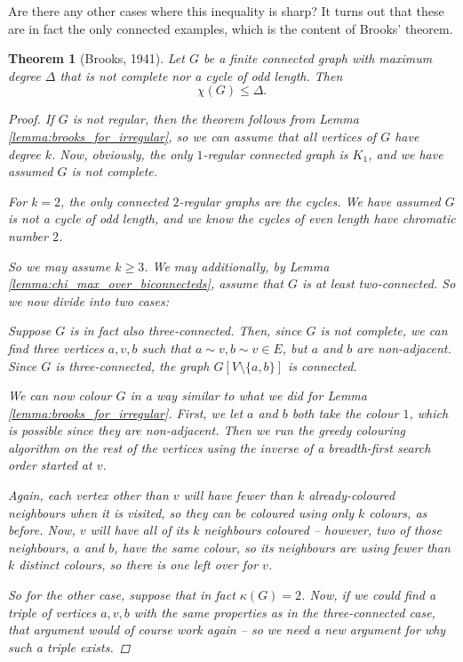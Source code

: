 \documentclass[nobib]{tufte-handout}
\newtheorem{theorem}{Theorem}
\begin{document}
Are there any other cases where this inequality is sharp? It turns out that these are in fact the only connected examples, which is the content of Brooks' theorem.

\begin{theorem}[Brooks, 1941]
  Let $G$ be a finite connected graph with maximum degree $\Delta$ that is not complete nor a cycle of odd length. Then
  $$\chi(G) \leq \Delta.$$

  \begin{proof}
    If $G$ is not regular, then the theorem follows from Lemma \ref{lemma:brooks_for_irregular}, so we can assume that all vertices of $G$ have degree $k$. Now, obviously, the only $1$-regular connected graph is $K_1$, and we have assumed $G$ is not complete.

    For $k=2$, the only connected $2$-regular graphs are the cycles. We have assumed $G$ is not a cycle of odd length, and we know the cycles of even length have chromatic number $2$.

    So we may assume $k \geq 3$. We may additionally, by Lemma \ref{lemma:chi_max_over_biconnecteds}, assume that $G$ is at least two-connected. So we now divide into two cases:

    Suppose $G$ is in fact also three-connected. Then, since $G$ is not complete, we can find three vertices $a, v, b$ such that $a \sim v, b \sim v \in E$, but $a$ and $b$ are non-adjacent. Since $G$ is three-connected, the graph $G[V\setminus \{a,b\}]$ is connected.

    We can now colour $G$ in a way similar to what we did for Lemma \ref{lemma:brooks_for_irregular}. First, we let $a$ and $b$ both take the colour $1$, which is possible since they are non-adjacent. Then we run the greedy colouring algorithm on the rest of the vertices using the inverse of a breadth-first search order started at $v$.

    Again, each vertex other than $v$ will have fewer than $k$ already-coloured neighbours when it is visited, so they can be coloured using only $k$ colours, as before. Now, $v$ will have all of its $k$ neighbours coloured -- however, two of those neighbours, $a$ and $b$, have the same colour, so its neighbours are using fewer than $k$ \emph{distinct} colours, so there is one left over for $v$.

    So for the other case, suppose that in fact $\kappa(G) = 2$. Now, if we could find a triple of vertices $a, v, b$ with the same properties as in the three-connected case, that argument would of course work again -- so we need a new argument for why such a triple exists.


\end{proof}
\end{theorem}
\end{document}
